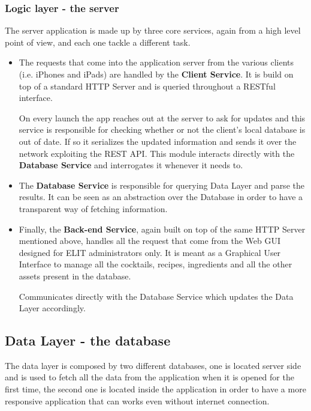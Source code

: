 \documentclass[paper=a4, fontsize=12pt]{scrartcl}
\numberwithin{equation}{section}		%
\numberwithin{figure}{section}			%
\numberwithin{table}{section}				%
\begin{document}
\subsubsection{Logic layer - the server}

The server application is made up by three core services, again from a high level point of view, and each one tackle a different task.

\begin{itemize}
\item The requests that come into the application server from the various clients (i.e. iPhones and iPads) are handled by the \textbf{Client Service}. It is build on top of a standard HTTP Server and is queried throughout a RESTful interface. 

On every launch the app reaches out at the server to ask for updates and this service is responsible for checking whether or not the client's local database is out of date. If so it serializes the updated information and sends it over the network exploiting the REST API. This module interacts directly with the \textbf{Database Service} and interrogates it whenever it needs to.
\item The \textbf{Database Service} is responsible for querying Data Layer and parse the results. It can be seen as an abstraction over the Database in order to have a transparent way of fetching information.
\item Finally, the \textbf{Back-end Service}, again built on top of the same HTTP Server mentioned above, handles all the request that come from the Web GUI designed for ELIT administrators only. It is meant as a Graphical User Interface to manage all the cocktails, recipes, ingredients and all the other assets present in the database.  

Communicates directly with the Database Service which updates the Data Layer accordingly.
\end{itemize}


\subsection{Data Layer - the database}





The data layer is composed by two different databases, one is located server side and is used to fetch all the data from the application when it is opened for the first time, the second one is located inside the application in order to have a more responsive application that can works even without internet connection.
\end{document}
